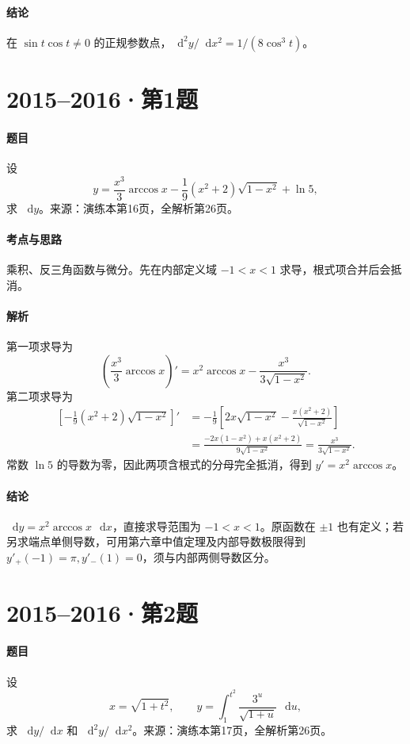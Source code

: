 \documentclass[UTF8,fontset=fandol,12pt,oneside,openany]{ctexrep}
\newcommand{\dd}{\mathop{}\!\mathrm d}
\theoremstyle{definition}
\begin{document}
\paragraph{结论}在 $\sin t\cos t\ne0$ 的正规参数点，$\dd^2y/\dd x^2=1/(8\cos^3t)$。

\par\addvspace{18pt}\noindent\begin{minipage}{\linewidth}
\section{2015--2016·第1题}
\paragraph{题目}设
\[
 y=\frac{x^3}3\arccos x-\frac19(x^2+2)\sqrt{1-x^2}+\ln5,
\]
求 $\dd y$。来源：演练本第16页，全解析第26页。
\end{minipage}\par
\paragraph{考点与思路}乘积、反三角函数与微分。先在内部定义域 $-1<x<1$ 求导，根式项合并后会抵消。
\paragraph{解析}第一项求导为
\[
 \left(\frac{x^3}3\arccos x\right)'
 =x^2\arccos x-\frac{x^3}{3\sqrt{1-x^2}}.
\]
第二项求导为
\begin{align*}
 \left[-\frac19(x^2+2)\sqrt{1-x^2}\right]'
 &=-\frac19\left[2x\sqrt{1-x^2}-\frac{x(x^2+2)}{\sqrt{1-x^2}}\right]\\
 &=\frac{-2x(1-x^2)+x(x^2+2)}{9\sqrt{1-x^2}}
 =\frac{x^3}{3\sqrt{1-x^2}}.
\end{align*}
常数 $\ln5$ 的导数为零，因此两项含根式的分母完全抵消，得到 $y'=x^2\arccos x$。
\paragraph{结论}$\dd y=x^2\arccos x\,\dd x$，直接求导范围为 $-1<x<1$。原函数在 $\pm1$ 也有定义；若另求端点单侧导数，可用第六章中值定理及内部导数极限得到 $y'_+(-1)=\pi,y'_-(1)=0$，须与内部两侧导数区分。

\par\addvspace{18pt}\noindent\begin{minipage}{\linewidth}
\section{2015--2016·第2题}
\paragraph{题目}设
\[
 x=\sqrt{1+t^2},\qquad
 y=\int_1^{t^2}\frac{3^u}{\sqrt{1+u}}\,\dd u,
\]
求 $\dd y/\dd x$ 和 $\dd^2y/\dd x^2$。来源：演练本第17页，全解析第26页。
\end{minipage}\par
\end{document}
